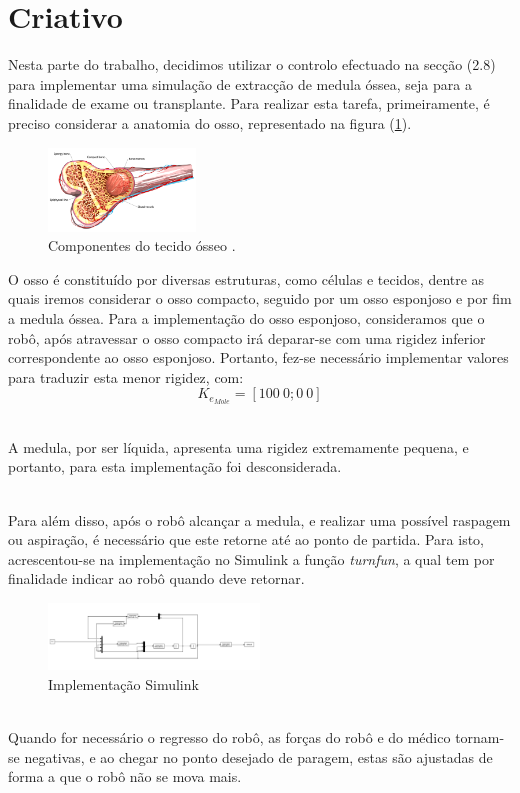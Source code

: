 \documentclass[a4paper,twocolumn,final,11pt]{article}
\let\oldref\ref
\renewcommand{\ref}[1]{(\oldref{#1})}
\begin{document}
\section{Criativo}
 Nesta parte do trabalho, decidimos utilizar o controlo efectuado na secção (2.8) para implementar uma simulação de extracção de medula óssea, seja para a finalidade de exame ou transplante.
Para realizar esta tarefa, primeiramente, é preciso considerar a anatomia do osso, representado na figura \ref{figosso}.
 \begin{figure}[H]
	\centering
	\includegraphics[width=0.35\textwidth]{osso.jpg}
	\caption{Componentes do tecido ósseo \cite{bone}.}
  \label{figosso}
\end{figure}
 O osso é constituído por diversas estruturas, como células e tecidos, dentre as quais iremos considerar o osso compacto, seguido por um osso esponjoso e por fim a medula óssea.
 Para a implementação do osso esponjoso, consideramos que o robô, após atravessar o osso compacto irá deparar-se com uma rigidez inferior correspondente ao osso esponjoso.
 Portanto, fez-se necessário implementar valores para traduzir esta menor rigidez, com:
\begin{equation}
    K_{e_{Mole}}=[100~0; 0~0]
\end{equation}

\\ 
A medula, por ser líquida, apresenta uma rigidez extremamente pequena, e portanto, para esta implementação foi desconsiderada.

\\
Para além disso, após o robô alcançar a medula, e realizar uma possível raspagem ou aspiração, é necessário que este retorne até ao ponto de partida.
Para isto, acrescentou-se na implementação no Simulink a função \textit{turnfun}, a qual tem por finalidade indicar ao robô quando deve retornar.
\begin{figure}[H]
	\centering
	\includegraphics[width=0.5\textwidth]{simulink.png}
	\caption{Implementação Simulink}
\label{simulink}
\end{figure}
\\
Quando for necessário o regresso do robô, as forças do robô e do médico tornam-se negativas, e ao chegar no ponto desejado de paragem, estas são ajustadas de forma a que o robô não se mova mais. 
\end{document}
